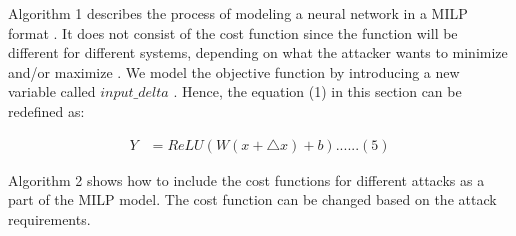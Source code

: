 Algorithm 1 describes the process of modeling a neural network in a MILP format . It does not consist of the cost function since the function will be different for different systems, depending on what the attacker wants to minimize and/or maximize . 
We model the objective function by introducing a new variable called $input\_delta$ . Hence, the equation (1) 
in this section can be redefined as:

\begin{align}
Y &=  ReLU(W(x + \bigtriangleup  x ) + b) ...... (5)
\end{align}

Algorithm 2 shows how to include the cost functions for different attacks as a part of the MILP model. 
The cost function can be changed based on the attack requirements. 
 
